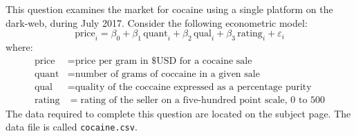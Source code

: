 \documentclass[12pt,a4paper]{article}
\begin{document}
\noindent This question examines the market for cocaine using a single platform on the dark-web, during July 2017. Consider the following econometric model:
\[
\mbox{price}_{i} = \beta_{0} + \beta_{1}\,\mbox{quant}_{i} + \beta_{2}\,\mbox{qual}_{i} + \beta_{3}\,\mbox{rating}_{i} + \varepsilon_{i}
\]
where:
\begin{align*}
\mbox{price } & = \mbox{price per gram in \$USD for a cocaine sale}\\
\mbox{quant} & = \mbox{number of grams of coccaine in a given sale}\\
\mbox{qual} & = \mbox{quality of the coccaine expressed as a percentage purity}\\
\mbox{rating} & = \mbox{rating of the seller on a five-hundred point scale, $0$ to $500$}
\end{align*}
The data required to complete this question are located on the
subject page. The data file is called \texttt{cocaine.csv}. \vspace{0.1in}
\end{document}
